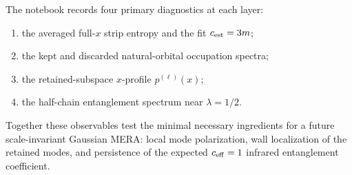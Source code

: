\documentclass[aps,prb,twocolumn,floatfix]{revtex4-2}
\begin{document}
The notebook records four primary diagnostics at each layer:
\begin{enumerate}
\item the averaged full-\(x\) strip entropy and the fit
      \(c_{\rm est}=3m\);
\item the kept and discarded natural-orbital occupation spectra;
\item the retained-subspace \(x\)-profile \(p^{(\ell)}(x)\);
\item the half-chain entanglement spectrum near \(\lambda=1/2\).
\end{enumerate}
Together these observables test the minimal necessary ingredients for a future
scale-invariant Gaussian MERA: local mode polarization, wall localization of
the retained modes, and persistence of the expected \(c_{\rm eff}=1\) infrared
entanglement coefficient.
\end{document}
